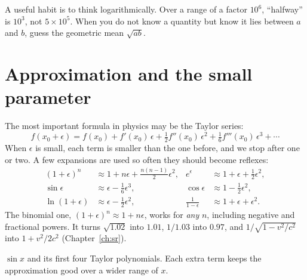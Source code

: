 A useful habit is to think logarithmically. Over a range of a factor $10^{6}$, ``halfway'' is $10^{3}$, not $5\times 10^{5}$. When you do not know a quantity but know it lies between $a$ and $b$, guess the geometric mean $\sqrt{ab}$.

\section{Approximation and the small parameter}

The most important formula in physics may be the Taylor series:
\[
  f(x_0 + \epsilon) = f(x_0) + f'(x_0)\,\epsilon + \tfrac12 f''(x_0)\,\epsilon^{2} + \tfrac16 f'''(x_0)\,\epsilon^3 + \cdots
\]
When $\epsilon$ is small, each term is smaller than the one before, and we stop after one or two. A few expansions are used so often they should become reflexes:
\begin{align*}
  (1+\epsilon)^{n} &\approx 1 + n\epsilon + \tfrac{n(n-1)}{2}\epsilon^2, &
  e^{\epsilon} &\approx 1 + \epsilon + \tfrac12\epsilon^{2}, \\
  \sin\epsilon &\approx \epsilon - \tfrac16\epsilon^{3}, &
  \cos\epsilon &\approx 1 - \tfrac12\epsilon^{2}, \\
  \ln(1+\epsilon) &\approx \epsilon - \tfrac12\epsilon^{2}, &
  \frac{1}{1-\epsilon} &\approx 1+\epsilon+\epsilon^2 .
\end{align*}
The binomial one, $(1+\epsilon)^n\approx 1+n\epsilon$, works for \emph{any} $n$, including negative and fractional powers. It turns $\sqrt{1.02}$ into $1.01$, $1/1.03$ into $0.97$, and $1/\sqrt{1-v^2/c^2}$ into $1 + v^2/2c^2$ (Chapter~\ref{ch:sr}).

\begin{center}
\begin{minipage}{\linewidth}\centering
{}

{\small $\sin x$ and its first four Taylor polynomials. Each extra term keeps the approximation good over a wider range of $x$.}
\end{minipage}
\end{center}

